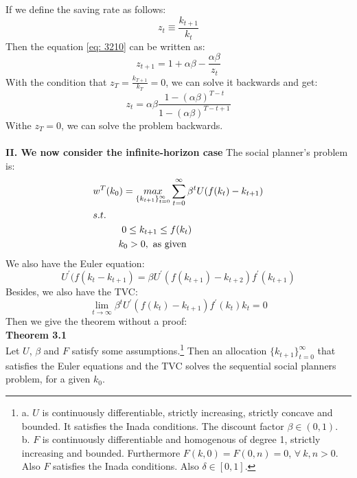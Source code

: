 \documentclass{article}
\begin{document}
If we define the saving rate as follows:
\begin{equation}
	z_t \equiv \frac{k_{t+1}}{k_t}
\end{equation}
Then the equation \eqref{eq: 3210} can be written as:
\begin{equation}
	z_{t+1} = 1 + \alpha \beta - \frac{\alpha \beta}{z_t}
\end{equation}
With the condition that $z_T = \frac{k_{T+1}}{k_T} = 0$, we can solve it backwards and get:
\begin{equation}
	z_t = \alpha \beta \frac{1 - (\alpha \beta)^{T-t}}{1 - (\alpha \beta)^{T-t+1}}
\end{equation}
Withe $z_T = 0$, we can solve the problem backwards.\\\\
\textbf{II. We now consider the infinite-horizon case}
The social planner's problem is:
\begin{align*}
	&w^T(k_0) = \mathop{max}\limits_{\{k_{t+1}\}^\infty_{t=0}} \sum\limits^\infty_{t=0} \beta^t U(f(k_t) - k_{t+1})\\
	&s.t.\\
	&\indent\indent 0 \leq k_{t+1} \leq f(k_t)\\
	&\indent\ \ \ \, k_0 > 0,\ \text{as given}
\end{align*}
We also have the Euler equation:
\begin{equation*}
	U^\prime(f(k_{t} - k_{t+1}) = \beta U^\prime(f(k_{t+1}) - k_{t+2}) f^\prime(k_{t+1})
\end{equation*}
Besides, we also have the TVC:
\begin{equation*}
	\lim\limits_{t \to \infty} \beta^t U^\prime(f(k_t) - k_{t+1}) f^\prime(k_t) k_t = 0
\end{equation*}
Then we give the theorem without a proof:\\
\textbf{Theorem 3.1}\\
Let $U$, $\beta$ and $F$ satisfy some assumptions.\footnote{a. $U$ is continuously differentiable, strictly increasing, strictly concave and bounded. It satisfies the Inada conditions. The discount factor $\beta \in (0, 1)$.\\
b.  $F$ is continuously differentiable and homogenous of degree 1, strictly increasing and bounded. Furthermore $F(k, 0) = F(0, n) = 0$, $\forall\ k, n > 0$. Also $F$ satisfies the Inada conditions. Also $\delta \in [0, 1]$.}
 Then an allocation $\{k_{t+1}\}^\infty_{t=0}$ that satisfies the Euler equations and the TVC solves the sequential social planners problem, for a given $k_0$.\\
\end{document}
